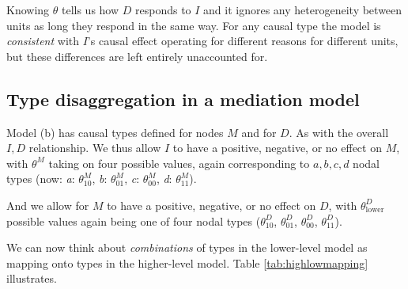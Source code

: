 \documentclass[
  12pt,
]{book}
\begin{document}
Knowing \(\theta\) tells us how \(D\) responds to \(I\) and it ignores any heterogeneity between units as long they respond in the same way. For any causal type the model is \emph{consistent} with \(I\)'s causal effect operating for different reasons for different units, but these differences are left entirely unaccounted for.

\hypertarget{type-disaggregation-in-a-mediation-model}{%
\subsection{Type disaggregation in a mediation model}\label{type-disaggregation-in-a-mediation-model}}

Model (b) has causal types defined for nodes \(M\) and for \(D\). As with the overall \(I,D\) relationship. We thus allow \(I\) to have a positive, negative, or no effect on \(M\), with \(\theta^M\) taking on four possible values, again corresponding to \(a,b,c,d\) nodal types (now: \emph{a}: \(\theta_{10}^M\), \emph{b}: \(\theta_{01}^M\), \emph{c}: \(\theta_{00}^M\), \emph{d}: \(\theta_{11}^M\)).

And we allow for \(M\) to have a positive, negative, or no effect on \(D\), with \(\theta^D_{\text{lower}}\) possible values again being one of four nodal types (\(\theta_{10}^D\), \(\theta_{01}^D\), \(\theta_{00}^D\), \(\theta_{11}^D\)).

We can now think about \emph{combinations} of types in the lower-level model as mapping onto types in the higher-level model. Table \ref{tab:highlowmapping} illustrates.
\end{document}
